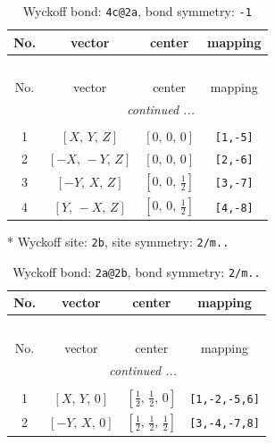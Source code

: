 \documentclass[fleqn,8pt]{jsarticle}
\begin{document}
\renewcommand{\arraystretch}{1.2}
\begin{longtable}{cccc}
\caption{Wyckoff bond: {\tt 4c@2a}, bond symmetry: {\tt -1}}
 \\
 \hline \hline
No. & vector & center & mapping \\ \hline \endfirsthead

\multicolumn{3}{l}{\tablename\ \thetable{}} \\
 \hline \hline
No. & vector & center & mapping \\ \hline \endhead

 \hline \hline
\multicolumn{3}{r}{\footnotesize\it continued ...} \\ \endfoot

 \hline \hline
\multicolumn{3}{r}{} \\ \endlastfoot

1 & $\left[ X,\, Y,\, Z \right]$ & $\left[ 0,\, 0,\, 0 \right]$ & {\tt [1,-5]} \\ \hline
2 & $\left[ - X,\, - Y,\, Z \right]$ & $\left[ 0,\, 0,\, 0 \right]$ & {\tt [2,-6]} \\ \hline
3 & $\left[ - Y,\, X,\, Z \right]$ & $\left[ 0,\, 0,\, \frac{1}{2} \right]$ & {\tt [3,-7]} \\ \hline
4 & $\left[ Y,\, - X,\, Z \right]$ & $\left[ 0,\, 0,\, \frac{1}{2} \right]$ & {\tt [4,-8]} \\
\end{longtable}
* Wyckoff site: {\tt 2b}, site symmetry: {\tt 2/m..}
\renewcommand{\arraystretch}{1.2}
\begin{longtable}{cccc}
\caption{Wyckoff bond: {\tt 2a@2b}, bond symmetry: {\tt 2/m..}}
 \\
 \hline \hline
No. & vector & center & mapping \\ \hline \endfirsthead

\multicolumn{3}{l}{\tablename\ \thetable{}} \\
 \hline \hline
No. & vector & center & mapping \\ \hline \endhead

 \hline \hline
\multicolumn{3}{r}{\footnotesize\it continued ...} \\ \endfoot

 \hline \hline
\multicolumn{3}{r}{} \\ \endlastfoot

1 & $\left[ X,\, Y,\, 0 \right]$ & $\left[ \frac{1}{2},\, \frac{1}{2},\, 0 \right]$ & {\tt [1,-2,-5,6]} \\ \hline
2 & $\left[ - Y,\, X,\, 0 \right]$ & $\left[ \frac{1}{2},\, \frac{1}{2},\, \frac{1}{2} \right]$ & {\tt [3,-4,-7,8]} \\
\end{longtable}
\end{document}
